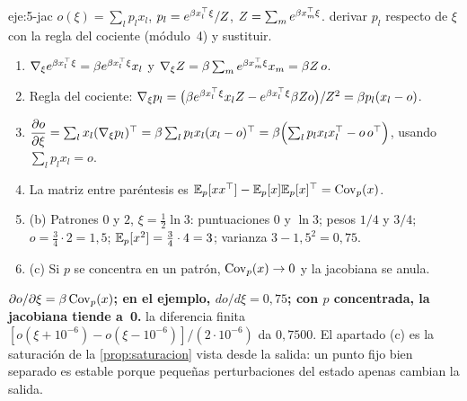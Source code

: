 \begin{solucion}{eje:5-jac}
\datos $o(\xi)=\sum_lp_lx_l$, $p_l=e^{\beta x_l^{\top}\xi}/Z$, $Z=\sum_me^{\beta x_m^{\top}\xi}$.
\planteamiento derivar $p_l$ respecto de $\xi$ con la regla del cociente (módulo~4) y sustituir.
\pasos
\begin{enumerate}[label=\arabic*.]
  \item $\nabla_\xi e^{\beta x_l^{\top}\xi}=\beta e^{\beta x_l^{\top}\xi}x_l$ y $\nabla_\xi Z=\beta\sum_me^{\beta x_m^{\top}\xi}x_m=\beta Z\,o$.
  \item Regla del cociente: $\nabla_\xi p_l=\bigl(\beta e^{\beta x_l^{\top}\xi}x_lZ-e^{\beta x_l^{\top}\xi}\beta Zo\bigr)/Z^{2}=\beta p_l(x_l-o)$.
  \item $\dfrac{\partial o}{\partial\xi}=\sum_lx_l(\nabla_\xi p_l)^{\top}=\beta\sum_lp_lx_l(x_l-o)^{\top}=\beta\Bigl(\sum_lp_lx_lx_l^{\top}-o\,o^{\top}\Bigr)$, usando $\sum_lp_lx_l=o$.
  \item La matriz entre paréntesis es $\mathbb{E}_p[xx^{\top}]-\mathbb{E}_p[x]\mathbb{E}_p[x]^{\top}=\operatorname{Cov}_p(x)$.
  \item (b) Patrones $0$ y $2$, $\xi=\tfrac12\ln3$: puntuaciones $0$ y $\ln3$; pesos $1/4$ y $3/4$; $o=\tfrac34\cdot2=1{,}5$; $\mathbb{E}_p[x^{2}]=\tfrac34\cdot4=3$; varianza $3-1{,}5^{2}=0{,}75$.
  \item (c) Si $p$ se concentra en un patrón, $\operatorname{Cov}_p(x)\to0$ y la jacobiana se anula.
\end{enumerate}
\resultado \textbf{$\partial o/\partial\xi=\beta\operatorname{Cov}_p(x)$; en el ejemplo, $do/d\xi=0{,}75$; con $p$ concentrada, la jacobiana tiende a~0.}
\comprobacion la diferencia finita $[o(\xi+10^{-6})-o(\xi-10^{-6})]/(2\cdot10^{-6})$ da $0{,}7500$. El apartado (c) es la saturación de la \cref{prop:saturacion} vista desde la salida: un punto fijo bien separado es estable porque pequeñas perturbaciones del estado apenas cambian la salida.
\end{solucion}

